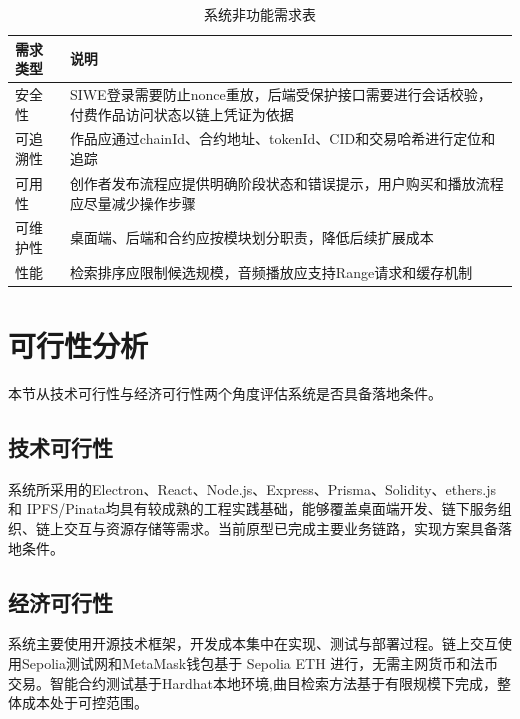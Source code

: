 \begin{table}[htbp]
    \linespread{1.5}
    \songti
    \centering
    \caption{系统非功能需求表}\label{tab:non_functional_requirements}
    \begin{tabular}{|l|p{10cm}|}
        \hline
        需求类型 & 说明                                                 \\ \hline
        安全性  & SIWE登录需要防止nonce重放，后端受保护接口需要进行会话校验，付费作品访问状态以链上凭证为依据 \\ \hline
        可追溯性 & 作品应通过chainId、合约地址、tokenId、CID和交易哈希进行定位和追踪          \\ \hline
        可用性  & 创作者发布流程应提供明确阶段状态和错误提示，用户购买和播放流程应尽量减少操作步骤           \\ \hline
        可维护性 & 桌面端、后端和合约应按模块划分职责，降低后续扩展成本                         \\ \hline
        性能   & 检索排序应限制候选规模，音频播放应支持Range请求和缓存机制                    \\ \hline
    \end{tabular}
\end{table}

\section{可行性分析}

本节从技术可行性与经济可行性两个角度评估系统是否具备落地条件。

\subsection{技术可行性}

系统所采用的Electron、React、Node.js、Express、Prisma、Solidity、ethers.js 和 IPFS/Pinata均具有较成熟的工程实践基础，能够覆盖桌面端开发、链下服务组织、链上交互与资源存储等需求。当前原型已完成主要业务链路，实现方案具备落地条件。

\subsection{经济可行性}

系统主要使用开源技术框架，开发成本集中在实现、测试与部署过程。链上交互使用Sepolia测试网和MetaMask钱包基于 Sepolia ETH 进行，无需主网货币和法币交易。智能合约测试基于Hardhat本地环境,曲目检索方法基于有限规模下完成，整体成本处于可控范围。
